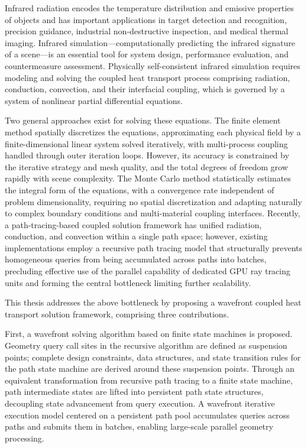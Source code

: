 \begin{ENGabstract}
Infrared radiation encodes the temperature distribution and emissive properties of objects and has important applications in target detection and recognition, precision guidance, industrial non-destructive inspection, and medical thermal imaging. Infrared simulation---computationally predicting the infrared signature of a scene---is an essential tool for system design, performance evaluation, and countermeasure assessment. Physically self-consistent infrared simulation requires modeling and solving the coupled heat transport process comprising radiation, conduction, convection, and their interfacial coupling, which is governed by a system of nonlinear partial differential equations.

Two general approaches exist for solving these equations. The finite element method spatially discretizes the equations, approximating each physical field by a finite-dimensional linear system solved iteratively, with multi-process coupling handled through outer iteration loops. However, its accuracy is constrained by the iterative strategy and mesh quality, and the total degrees of freedom grow rapidly with scene complexity. The Monte Carlo method statistically estimates the integral form of the equations, with a convergence rate independent of problem dimensionality, requiring no spatial discretization and adapting naturally to complex boundary conditions and multi-material coupling interfaces. Recently, a path-tracing-based coupled solution framework has unified radiation, conduction, and convection within a single path space; however, existing implementations employ a recursive path tracing model that structurally prevents homogeneous queries from being accumulated across paths into batches, precluding effective use of the parallel capability of dedicated GPU ray tracing units and forming the central bottleneck limiting further scalability.

This thesis addresses the above bottleneck by proposing a wavefront coupled heat transport solution framework, comprising three contributions.

First, a wavefront solving algorithm based on finite state machines is proposed. Geometry query call sites in the recursive algorithm are defined as suspension points; complete design constraints, data structures, and state transition rules for the path state machine are derived around these suspension points. Through an equivalent transformation from recursive path tracing to a finite state machine, path intermediate states are lifted into persistent path state structures, decoupling state advancement from query execution. A wavefront iterative execution model centered on a persistent path pool accumulates queries across paths and submits them in batches, enabling large-scale parallel geometry processing.


\end{ENGabstract}

